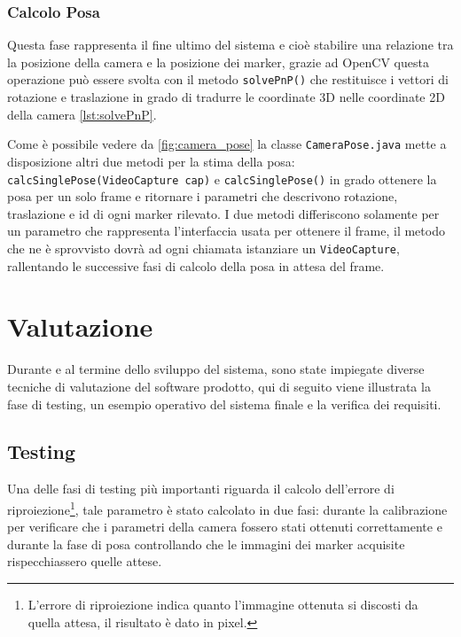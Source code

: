 \documentclass[12pt,a4paper,openright,twoside]{book}
\begin{document}




\subsection{Calcolo Posa} \label{subsec:calcolo_posa}
Questa fase rappresenta il fine ultimo del sistema e cioè stabilire una relazione tra la posizione della camera e la posizione dei marker, grazie ad OpenCV questa operazione può essere svolta con il metodo \texttt{solvePnP()}
che restituisce i vettori di rotazione e traslazione in grado di tradurre le coordinate 3D nelle coordinate 2D della camera \cref{lst:solvePnP}.

Come è possibile vedere da \ref{fig:camera_pose} la classe \texttt{CameraPose.java} mette a disposizione altri due metodi per la stima della posa: \texttt{calcSinglePose(VideoCapture cap)} e \texttt{calcSinglePose()} in grado ottenere la posa per un solo frame e ritornare i parametri che descrivono rotazione, traslazione e id di ogni marker rilevato.
I due metodi differiscono solamente per un parametro che rappresenta l'interfaccia usata per ottenere il frame, il metodo che ne è sprovvisto dovrà ad ogni chiamata istanziare un \texttt{VideoCapture}, rallentando le successive fasi di calcolo della posa in attesa del frame.

\chapter{Valutazione}
Durante e al termine dello sviluppo del sistema, sono state impiegate diverse tecniche di valutazione del software prodotto, qui di seguito viene illustrata la fase di testing, un esempio operativo del sistema finale e la verifica dei requisiti.
\section{Testing} \label{sec:testing}
Una delle fasi di testing più importanti riguarda il calcolo dell'errore di riproiezione\footnote{L'errore di riproiezione indica quanto l'immagine ottenuta si discosti da quella attesa, il risultato è dato in pixel.}, tale parametro è stato calcolato in due fasi: durante la calibrazione per verificare che i parametri della camera fossero stati ottenuti correttamente e durante la fase di posa controllando che le immagini dei marker acquisite rispecchiassero quelle attese.
\end{document}
